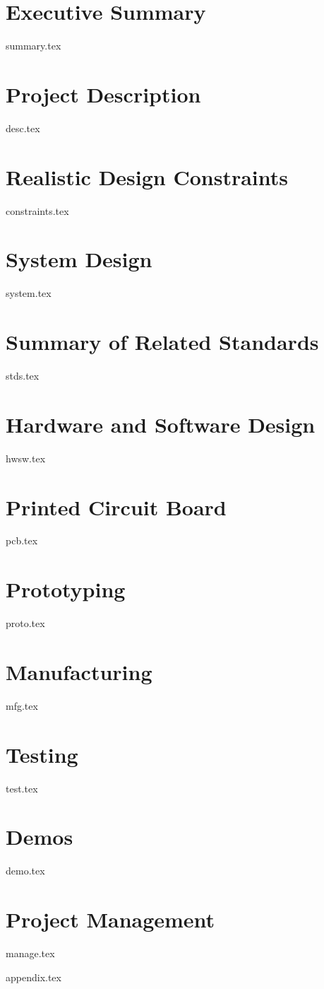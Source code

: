
\section{Executive Summary}
{summary.tex}

\section{Project Description}
{desc.tex}

\section{Realistic Design Constraints}
{constraints.tex}

\section{System Design}
\label{sec:sys-design}
{system.tex}

\section{Summary of Related Standards}
\label{sec:stds}
{stds.tex}

\section{Hardware and Software Design}
{hwsw.tex}

\section{Printed Circuit Board}
{pcb.tex}

\section{Prototyping}
{proto.tex}

\section{Manufacturing}
{mfg.tex}

\section{Testing}
{test.tex}

\section{Demos}
{demo.tex}

\section{Project Management}
{manage.tex}

\appendix
{appendix.tex}
